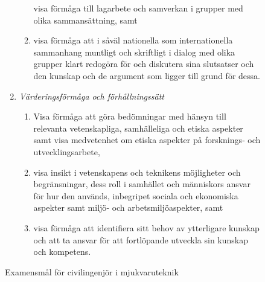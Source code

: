 \begin{figure}[tp]
\begin{tcbframe}
\begin{enumerate}
\begin{enumerate}
    visa förmåga till lagarbete och samverkan i grupper med olika
    sammansättning, samt
  \item
    visa förmåga att i såväl nationella som internationella sammanhang
    muntligt och skriftligt i dialog med olika grupper klart redogöra
    för och diskutera sina slutsatser och den kunskap och de argument
    som ligger till grund för dessa.
  \end{enumerate}
\item \emph{Värderingsförmåga och förhållningssätt}
  \begin{enumerate}
  \def\labelenumii{\Alph{enumi}\arabic{enumii}.}
  \tightlist
  \item
    Visa förmåga att göra bedömningar med hänsyn till relevanta
    vetenskapliga, samhälleliga och etiska aspekter samt visa
    medvetenhet om etiska aspekter på forsknings‐ och utvecklingsarbete, 
  \item
    visa insikt i vetenskapens och teknikens möjligheter och
    begränsningar, dess roll i samhället och människors ansvar för hur
    den används, inbegripet sociala och ekonomiska aspekter samt miljö‐
    och arbetsmiljöaspekter, samt
  \item
    visa förmåga att identifiera sitt behov av ytterligare kunskap och
    att ta ansvar för att fortlöpande utveckla sin kunskap och kompetens.
  \end{enumerate}
\end{enumerate}
\end{tcbframe}
\caption{Examensmål för civilingenjör i mjukvaruteknik\label{fig:exmal}}
\end{figure}

